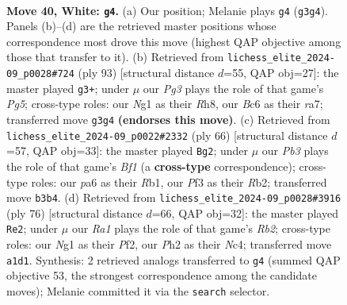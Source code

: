 \documentclass[11pt]{article}
\begin{document}
\clearpage

\begin{figure}[p]\centering
\begin{subfigure}{0.46\textwidth}\centering
\resizebox{\linewidth}{!}{%
\newchessgame
\chessboard[
  setfen={6r1/r7/p1B1bk2/Bn4pp/5p2/PP3PP1/1K5P/R4RN1 w - - 0 40},
  showmover=false,
  pgfstyle=straightmove, color=movearrow, markmove={g3-g4}
]}
\caption{}
\end{subfigure}\hfill
\begin{subfigure}{0.46\textwidth}\centering
\resizebox{\linewidth}{!}{%
\newchessgame
\chessboard[
  setfen={6rr/R2b4/2pk1p2/3p3p/1P1N2pP/2P2P2/5KP1/R7 b - - 1 47},
  showmover=false,
  pgfstyle=straightmove, color=movearrow, markmove={g4-g3}
]}
\caption{}
\end{subfigure}
\\[4pt]
\begin{subfigure}{0.46\textwidth}\centering
\resizebox{\linewidth}{!}{%
\newchessgame
\chessboard[
  setfen={8/5pk1/2b1r2p/2pNP1p1/2Pn1P2/r5PP/1R3K2/1R3B2 w - - 0 34},
  showmover=false,
  pgfstyle=straightmove, color=movearrow, markmove={f1-g2}
]}
\caption{}
\end{subfigure}\hfill
\begin{subfigure}{0.46\textwidth}\centering
\resizebox{\linewidth}{!}{%
\newchessgame
\chessboard[
  setfen={8/2b2pk1/r1r3p1/1Rn4p/2Np3P/3P2P1/1R3PK1/1B6 w - - 7 39},
  showmover=false,
  pgfstyle=straightmove, color=movearrow, markmove={b2-e2}
]}
\caption{}
\end{subfigure}
\caption{\textbf{Move 40, White: \texttt{g4}.} (a) Our position; Melanie plays \texttt{g4} (\texttt{g3g4}). Panels (b)--(d) are the retrieved master positions whose correspondence most drove this move (highest QAP objective among those that transfer to it). (b) Retrieved from \texttt{lichess\_elite\_2024-09\_p0028\#724} (ply 93) [structural distance $d$=55, QAP obj=27]: the master played \texttt{g3+}; under $\mu$ our \emph{Pg3} plays the role of that game's \emph{Pg5}; cross-type roles: our \emph{N}g1 as their \emph{R}h8, our \emph{B}c6 as their \emph{r}a7; transferred move \texttt{g3g4} \textbf{(endorses this move)}. (c) Retrieved from \texttt{lichess\_elite\_2024-09\_p0022\#2332} (ply 66) [structural distance $d$=57, QAP obj=33]: the master played \texttt{Bg2}; under $\mu$ our \emph{Pb3} plays the role of that game's \emph{Bf1} (a \textbf{cross-type} correspondence); cross-type roles: our \emph{p}a6 as their \emph{R}b1, our \emph{P}f3 as their \emph{R}b2; transferred move \texttt{b3b4}. (d) Retrieved from \texttt{lichess\_elite\_2024-09\_p0028\#3916} (ply 76) [structural distance $d$=66, QAP obj=32]: the master played \texttt{Re2}; under $\mu$ our \emph{Ra1} plays the role of that game's \emph{Rb2}; cross-type roles: our \emph{N}g1 as their \emph{P}f2, our \emph{P}h2 as their \emph{N}c4; transferred move \texttt{a1d1}. Synthesis: 2 retrieved analogs transferred to \texttt{g4} (summed QAP objective 53, the strongest correspondence among the candidate moves); Melanie committed it via the \texttt{search} selector.}
\label{fig:thought-m78}
\end{figure}
\end{document}
